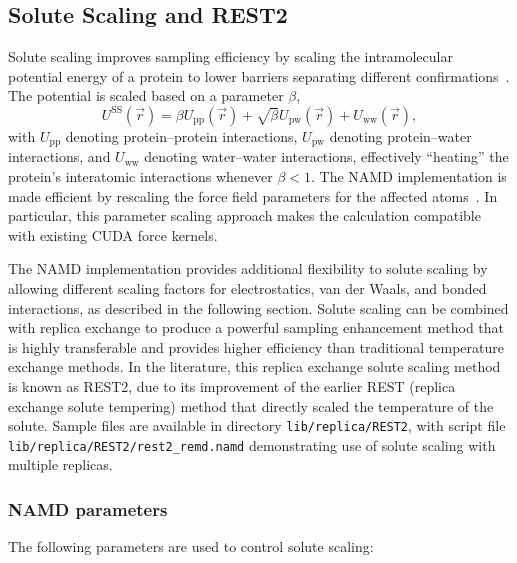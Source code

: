 \subsection{Solute Scaling and REST2}
\label{section:rest2}

Solute scaling improves sampling efficiency
by scaling the intramolecular potential energy of a protein
to lower barriers separating different confirmations~\cite{WANG2011E}.
The potential is scaled based on a parameter $\beta$,
\begin{equation}
U^{\text{SS}}(\vec{r}) =
\beta U_{\text{pp}}(\vec{r}) +
\sqrt{\beta} U_{\text{pw}}(\vec{r}) +
U_{\text{ww}}(\vec{r}),
\end{equation}
with $U_{\text{pp}}$ denoting protein--protein interactions,
$U_{\text{pw}}$ denoting protein--water interactions,
and $U_{\text{ww}}$ denoting water--water interactions,
effectively ``heating'' the protein's interatomic interactions
whenever $\beta < 1$.
The NAMD implementation is made efficient by rescaling
the force field parameters for the affected atoms~\cite{JO2015}.
In particular, this parameter scaling approach makes the calculation
compatible with existing CUDA force kernels.

The NAMD implementation provides additional flexibility to
solute scaling by allowing different scaling factors for electrostatics,
van der Waals, and bonded interactions, as described in the
following section.
Solute scaling can be combined with replica exchange
to produce a powerful sampling enhancement method
that is highly transferable and provides higher efficiency
than traditional temperature exchange methods.
In the literature, this replica exchange solute scaling method
is known as REST2, due to its improvement of the earlier
REST (replica exchange solute tempering) method
that directly scaled the temperature of the solute.
Sample files are available in directory {\tt lib/replica/REST2},
with script file {\tt lib/replica/REST2/rest2\_remd.namd}
demonstrating use of solute scaling with multiple replicas.

\subsubsection{NAMD parameters}

The following parameters are used to control solute scaling:

